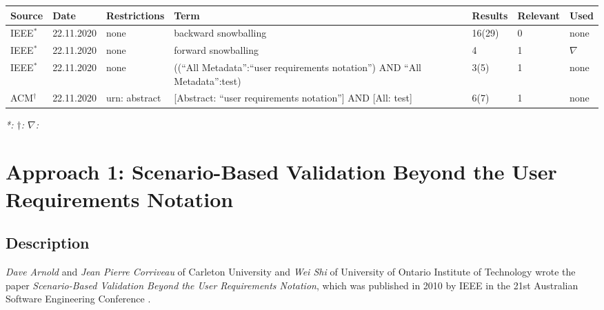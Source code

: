 \begin{table}[h]
	\begin{small}
	\caption{Literature Research Documentation.}
	\begin{longtable}{p{1cm}|p{1.5cm}|>{\raggedright}p{2cm}|>{\raggedright}p{3.7cm}|p{1.3cm}|p{1.4cm}|p{0.7cm}}
		\hline
		\textbf{Source} & \textbf{Date} & \textbf{Restrictions} & \textbf{Term} & \textbf{Results} & \textbf{Relevant} & \textbf{Used}\\
		\hline
		IEEE$^*$ & 22.11.2020 & none & backward snowballing & 16(29) & 0 & none \\
		\hline
		IEEE$^*$ & 22.11.2020 & none & forward snowballing & 4 & 1 & $\nabla$ \\
		\hline
		IEEE$^*$ & 22.11.2020 & none & ((\enquote{All Metadata}:\enquote{user requirements notation}) AND \enquote{All Metadata}:test) & 3(5) & 1 & none\\
		\hline
		ACM$^\dagger$ & 22.11.2020 & urn: abstract & [Abstract: \enquote{user requirements notation}] AND [All: test] & 6(7) & 1 & none \\
		\hline
	\end{longtable}
	\textit{*: \cite{ieee} \quad $\dagger$: \cite{acm} \quad $\nabla$: \cite{BoucherMussbacher2017}}
	\label{tab:08_research}
\end{small}
\end{table}
\section{Approach 1: Scenario-Based Validation Beyond the User Requirements Notation}
\label{topic08:sectionApproach1}

\subsection{Description}

\textit{Dave Arnold} and \textit{Jean Pierre Corriveau} of Carleton University and \textit{Wei Shi} of University of Ontario Institute of Technology wrote the paper \textit{Scenario-Based Validation Beyond the User Requirements Notation}, which was published in 2010 by IEEE in the 21st Australian Software Engineering Conference \cite{ArnoldCorriveauShi2010}.


